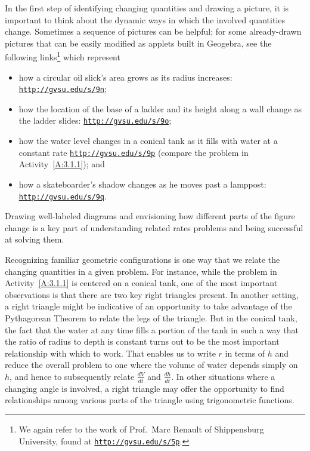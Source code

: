 In the first step of identifying changing quantities and drawing a picture, it is important to think about the dynamic ways in which the involved quantities change.  Sometimes a sequence of pictures can be helpful; for some already-drawn pictures that can be easily modified as applets built in Geogebra, see the following links\footnote{We again refer to the work of Prof.~Marc Renault of Shippensburg University, found at \href{http://gvsu.edu/s/5p}{\texttt{http://gvsu.edu/s/5p}}.} which represent 
\begin{itemize}
\item how a circular oil slick's area grows as its radius increases: \href{http://gvsu.edu/s/9n}{\texttt{http://gvsu.edu/s/9n}};
\item how the location of the base of a ladder and its height along a wall change as the ladder slides: \href{http://gvsu.edu/s/9o}{\texttt{http://gvsu.edu/s/9o}};
\item how the water level changes in a conical tank as it fills with water at a constant rate \href{http://gvsu.edu/s/9p}{\texttt{http://gvsu.edu/s/9p}} (compare the problem in Activity~\ref{A:3.1.1}); and
\item how a skateboarder's shadow changes as he moves past a lamppost: \href{http://gvsu.edu/s/9q}{\texttt{http://gvsu.edu/s/9q}}.
\end{itemize}
Drawing well-labeled diagrams and envisioning how different parts of the figure change is a key part of understanding related rates problems and being successful at solving them.





Recognizing familiar geometric configurations is one way that we relate the changing quantities in a given problem.  For instance, while the problem in Activity~\ref{A:3.1.1} is centered on a conical tank, one of the most important observations is that there are two key right triangles present.  In another setting, a right triangle might be indicative of an opportunity to take advantage of the Pythagorean Theorem to relate the legs of the triangle.  But in the conical tank, the fact that the water at any time fills a portion of the tank in such a way that the ratio of radius to depth is constant turns out to be the most important relationship with which to work.  That enables us to write $r$ in terms of $h$ and reduce the overall problem to one where the volume of water depends simply on $h$, and hence to subsequently relate $\frac{dV}{dt}$ and $\frac{dh}{dt}$.  In other situations where a changing angle is involved, a right triangle may offer the opportunity to find relationships among various parts of the triangle using trigonometric functions.

